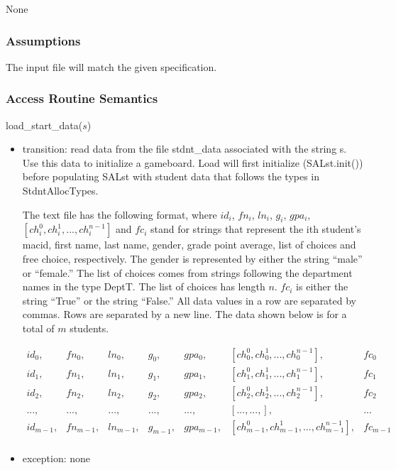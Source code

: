 \documentclass[12pt]{article}
\begin{document}
None

\subsubsection* {Assumptions}

The input file will match the given specification.

\subsubsection* {Access Routine Semantics}

\noindent load\_start\_data($s$)
\begin{itemize}
\item transition: read data from the file stdnt\_data associated with the string s.
  Use this data to initialize a gameboard. Load will first
  initialize  (SALst.init()) before populating SALst with student data that
  follows the types in StdntAllocTypes.

  The text file has the following format, where $id_i$, $fn_i$, $ln_i$, $g_i$,
  $gpa_i$, $[ch_i^0, ch_i^1, ..., ch_i^{n-1}]$ and $fc_i$ stand for strings that
  represent the ith student's macid, first name, last name, gender, grade point
  average, list of choices and free choice, respectively.  The gender is
  represented by either the string ``male'' or ``female.''  The list of choices
  comes from strings following the department names in the type DeptT.  The list
  of choices has length $n$.  $fc_i$ is either the string ``True'' or the string
  ``False.''  All data values in a row are separated by commas.  Rows are
  separated by a new line.  The data shown below is for a total of $m$ students.

  \begin{equation}
    \begin{array}{ccccccc}
      id_0, & fn_0, & ln_0, & g_0, & gpa_0, & [ch_0^0, ch_0^1, ..., ch_0^{n-1}], & fc_0 \\
      id_1, & fn_1, & ln_1, & g_1, & gpa_1, & [ch_1^0, ch_1^1, ..., ch_1^{n-1}], & fc_1\\
      id_2, & fn_2, & ln_2, & g_2, & gpa_2, & [ch_2^0, ch_2^1, ..., ch_2^{n-1}], & fc_2
      \\
      ..., & ..., & ..., & ..., & ..., & [..., ..., ], & ...
      \\
      id_{m-1}, & fn_{m-1}, & ln_{m-1}, & g_{m-1}, & gpa_{m-1}, & [ch_{m-1}^0, ch_{m-1}^1, ..., ch_{m-1}^{n-1}], & fc_{m-1} \\
    \end{array}
  \end{equation}

\item exception: none
\end{itemize}
\end{document}
